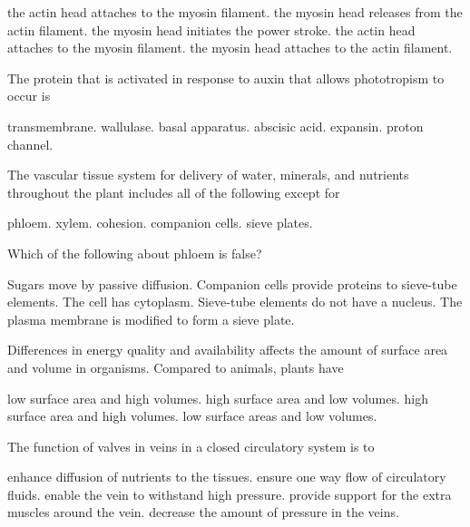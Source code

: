 \begin{choices}
\choice the actin head attaches to the myosin filament. 
\correctchoice the myosin head releases from the actin filament. 
\choice the myosin head initiates the power stroke. 
\choice the actin head attaches to the myosin filament. 
\choice the myosin head attaches to the actin filament.  
\end{choices}


\question
The protein that is activated in response to auxin that allows phototropism to occur is

\begin{choices}
\choice transmembrane. 
\choice wallulase. 
\choice basal apparatus. 
\choice abscisic acid. 
\correctchoice expansin. 
\choice proton channel. 
\end{choices}

\question
The vascular tissue system for delivery of water, minerals, and nutrients throughout the plant includes all of the following except for

\begin{choices}
\choice phloem. 
\choice xylem. 
\correctchoice cohesion. 
\choice companion cells. 
\choice sieve plates. 
\end{choices}

\question
Which of the following about phloem is false?

\begin{choices}
\choice Sugars move by passive diffusion. 
\choice Companion cells provide proteins to sieve-tube elements. 
\choice The cell has cytoplasm. 
\choice Sieve-tube elements do not have a nucleus. 
\correctchoice The plasma membrane is modified to form a sieve plate. 
\end{choices}

\newpage

\question
Differences in energy quality and availability affects the amount of surface area and volume in organisms. Compared to animals, plants have 

\begin{choices}
\choice low surface area and high volumes. 
\correctchoice high surface area and low volumes. 
\choice high surface area and high volumes. 
\choice low surface areas and low volumes.  
\end{choices}


\question
The function of valves in veins in a closed circulatory system is to 
\begin{choices}
\choice enhance diffusion of nutrients to the tissues. 
\correctchoice ensure one way flow of circulatory fluids. 
\choice enable the vein to withstand high pressure. 
\choice provide support for the extra muscles around the vein. 
\choice decrease the amount of pressure in the veins.  
\end{choices}
